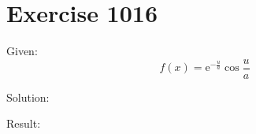 \documentclass[a4paper, 10pt]{scrartcl}
\newcommand*\euler{\mathrm{e}}
\begin{document}
\section{Exercise 1016}

Given:
\[
f(x) = \euler^{-\frac{u}{a}}\cos{\frac{u}{a}}
\]

Solution:

Result:
\end{document}
